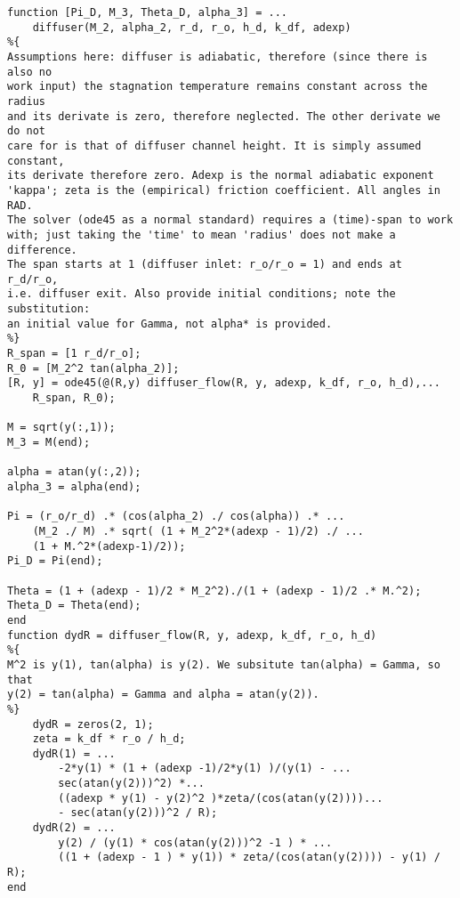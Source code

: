 \begin{lstlisting}[caption={[Vaneless adiabatic diffuser]Vaneless adiabatic diffuser, \iecfeg{cf.}\ \cref{ch:diffuser}},label={matlab:stanitz}]
function [Pi_D, M_3, Theta_D, alpha_3] = ...
	diffuser(M_2, alpha_2, r_d, r_o, h_d, k_df, adexp)
%{
Assumptions here: diffuser is adiabatic, therefore (since there is also no
work input) the stagnation temperature remains constant across the radius
and its derivate is zero, therefore neglected. The other derivate we do not
care for is that of diffuser channel height. It is simply assumed constant,
its derivate therefore zero. Adexp is the normal adiabatic exponent
'kappa'; zeta is the (empirical) friction coefficient. All angles in RAD.
The solver (ode45 as a normal standard) requires a (time)-span to work
with; just taking the 'time' to mean 'radius' does not make a difference.
The span starts at 1 (diffuser inlet: r_o/r_o = 1) and ends at r_d/r_o,
i.e. diffuser exit. Also provide initial conditions; note the substitution:
an initial value for Gamma, not alpha* is provided.
%}
R_span = [1 r_d/r_o];
R_0 = [M_2^2 tan(alpha_2)];
[R, y] = ode45(@(R,y) diffuser_flow(R, y, adexp, k_df, r_o, h_d),...
	R_span, R_0);

M = sqrt(y(:,1));
M_3 = M(end);

alpha = atan(y(:,2));
alpha_3 = alpha(end);

Pi = (r_o/r_d) .* (cos(alpha_2) ./ cos(alpha)) .* ...
	(M_2 ./ M) .* sqrt( (1 + M_2^2*(adexp - 1)/2) ./ ...
	(1 + M.^2*(adexp-1)/2));
Pi_D = Pi(end);

Theta = (1 + (adexp - 1)/2 * M_2^2)./(1 + (adexp - 1)/2 .* M.^2);
Theta_D = Theta(end);
end
function dydR = diffuser_flow(R, y, adexp, k_df, r_o, h_d)
%{
M^2 is y(1), tan(alpha) is y(2). We subsitute tan(alpha) = Gamma, so that
y(2) = tan(alpha) = Gamma and alpha = atan(y(2)).
%}
	dydR = zeros(2, 1);
	zeta = k_df * r_o / h_d;
	dydR(1) = ...
		-2*y(1) * (1 + (adexp -1)/2*y(1) )/(y(1) - ...
		sec(atan(y(2)))^2) *...
		((adexp * y(1) - y(2)^2 )*zeta/(cos(atan(y(2))))...
		- sec(atan(y(2)))^2 / R);
	dydR(2) = ...
		y(2) / (y(1) * cos(atan(y(2)))^2 -1 ) * ...
		((1 + (adexp - 1 ) * y(1)) * zeta/(cos(atan(y(2)))) - y(1) / R);
end
\end{lstlisting}

